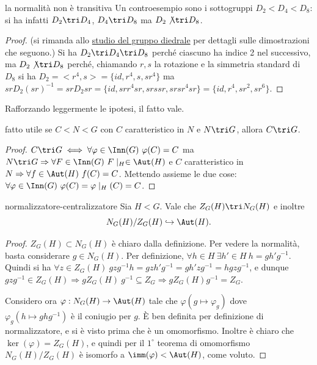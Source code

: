 \begin{proposition}{la normalità non è transitiva}
    Un controesempio sono i sottogruppi $D_2 < D_4 < D_8$: si ha infatti $D_2 \tri D_4$, $D_4 \tri D_8$ ma $D_2 \not \tri D_8$.
\end{proposition}
\begin{proof}
    (si rimanda allo \hyperlink{diedrale}{studio del gruppo diedrale} per dettagli sulle dimostrazioni che seguono.) Si ha $D_2 \tri D_4 \tri D_8$ perché ciascuno ha indice 2 nel successivo, ma $D_2 \not \tri D_8$ perché, chiamando $r,s$ la rotazione e la simmetria standard di $D_8$ si ha $D_2 = <r^4, s> = \{id, r^4, s, sr^4\}$ ma $srD_2(sr)^{-1} = srD_2sr = \{id, srr^4sr, srssr, srsr^4sr\} = \{id, r^4, sr^2, sr^6\}$. 
\end{proof}
Rafforzando leggermente le ipotesi, il fatto vale.
\begin{proposition}{fatto utile}
    se $C < N< G$ con $C$ caratteristico in $N$ e $N \tri G$, allora $C \tri G$.
\end{proposition}
\begin{proof}
    $C \tri G \iff \forall \varphi \in \Inn(G) \ \varphi(C) = C$ ma $N \tri G \Rightarrow \forall F \in \Inn(G) \ F\mid_H \in \Aut(H)$ e $C$ caratteristico in $N \Rightarrow \forall f \in \Aut(H) \ f(C)= C$. Mettendo assieme le due cose: $ \forall \varphi \in \Inn(G) \ \varphi(C)  = \varphi\mid_H(C) = C$. 
\end{proof}
\begin{lemma}{normalizzatore-centralizzatore}
    Sia $H < G$.  Vale che $Z_G(H) \tri N_G(H)$ e inoltre
    \[
        N_G(H)/Z_G(H) \hookrightarrow \Aut(H).
    \]
\end{lemma}
\begin{proof}
    $Z_G(H) \subset N_G(H)$ è chiaro dalla definizione. Per vedere la normalità, basta considerare $g \in N_G(H)$. Per definizione, $\forall h \in H \ \exists h' \in H \ h = gh'g^{-1}$.
    Quindi si ha $\forall z \in Z_G(H) \ gzg^{-1}h = gzh'g^{-1} = gh'zg^{-1} = hgzg^{-1}$,
    e dunque $gzg^{-1} \in Z_G(H) \Rightarrow gZ_G(H) \ g^{-1} \subseteq Z_G  \Rightarrow gZ_G(H)g^{-1} = Z_G$.
    
    Considero ora $\varphi: N_G(H) \rightarrow \Aut(H)$ tale che $\varphi(g \mapsto \varphi_g)$ dove $\varphi_g(h \mapsto ghg^{-1})$ è il coniugio per $g$. È ben definita per definizione di normalizzatore, e si è visto prima che è un omomorfismo. Inoltre è chiaro che $\ker(\varphi) = Z_G(H)$, e quindi per il $1^{\circ}$ teorema di omomorfismo $N_G(H)/Z_G(H)$ è isomorfo a $\imm(\varphi) < \Aut(H)$, come voluto. 
\end{proof}

